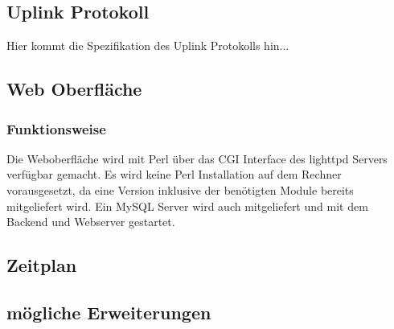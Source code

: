 \documentclass[12pt,a4paper]{article}
\begin{document}
\subsection{Uplink Protokoll}

Hier kommt die Spezifikation des Uplink Protokolls hin...

\subsection{Web Oberfläche}

\subsubsection{Funktionsweise}

Die Weboberfläche wird mit Perl über das CGI Interface des lighttpd Servers verfügbar gemacht. Es wird keine Perl Installation auf dem Rechner vorausgesetzt, da eine Version inklusive der benötigten Module bereits mitgeliefert wird. Ein MySQL Server wird auch mitgeliefert und mit dem Backend und Webserver gestartet.


\subsection{Zeitplan}
\subsection{mögliche Erweiterungen}
\end{document}
